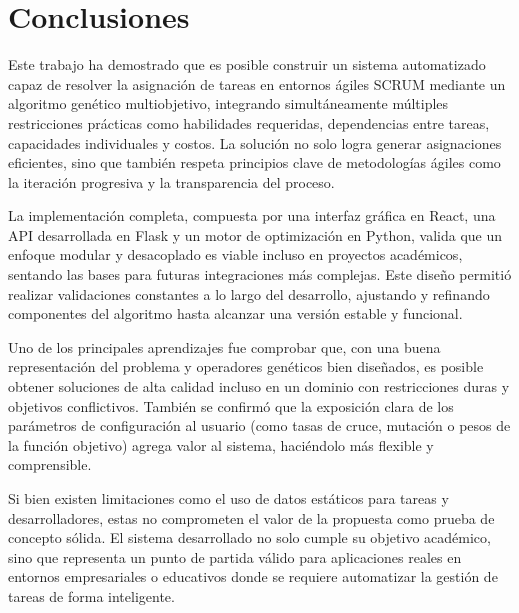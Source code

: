 \section{Conclusiones}

Este trabajo ha demostrado que es posible construir un sistema automatizado capaz de resolver la asignación de tareas en entornos ágiles SCRUM mediante un algoritmo genético multiobjetivo, integrando simultáneamente múltiples restricciones prácticas como habilidades requeridas, dependencias entre tareas, capacidades individuales y costos. La solución no solo logra generar asignaciones eficientes, sino que también respeta principios clave de metodologías ágiles como la iteración progresiva y la transparencia del proceso.

La implementación completa, compuesta por una interfaz gráfica en React, una API desarrollada en Flask y un motor de optimización en Python, valida que un enfoque modular y desacoplado es viable incluso en proyectos académicos, sentando las bases para futuras integraciones más complejas. Este diseño permitió realizar validaciones constantes a lo largo del desarrollo, ajustando y refinando componentes del algoritmo hasta alcanzar una versión estable y funcional.

Uno de los principales aprendizajes fue comprobar que, con una buena representación del problema y operadores genéticos bien diseñados, es posible obtener soluciones de alta calidad incluso en un dominio con restricciones duras y objetivos conflictivos. También se confirmó que la exposición clara de los parámetros de configuración al usuario (como tasas de cruce, mutación o pesos de la función objetivo) agrega valor al sistema, haciéndolo más flexible y comprensible.

Si bien existen limitaciones como el uso de datos estáticos para tareas y desarrolladores, estas no comprometen el valor de la propuesta como prueba de concepto sólida. El sistema desarrollado no solo cumple su objetivo académico, sino que representa un punto de partida válido para aplicaciones reales en entornos empresariales o educativos donde se requiere automatizar la gestión de tareas de forma inteligente.



